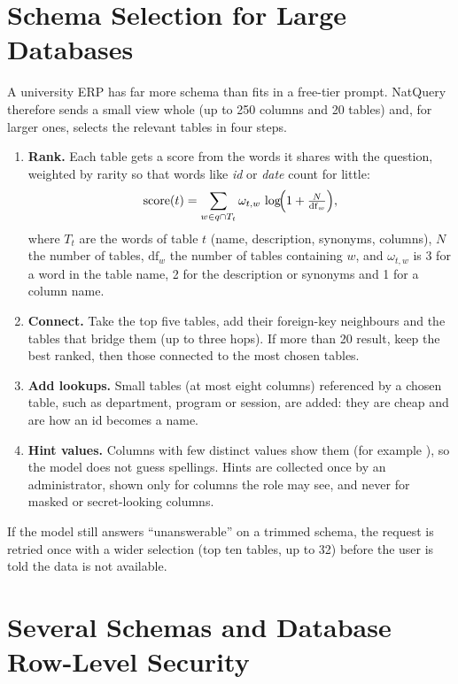 \section{Schema Selection for Large Databases}
\label{sec:select}

A university ERP has far more schema than fits in a free-tier prompt. NatQuery therefore sends a small
view whole (up to 250 columns and 20 tables) and, for larger ones, selects the relevant tables in four
steps.

\begin{enumerate}
  \item \textbf{Rank.} Each table gets a score from the words it shares with the question,
        weighted by rarity so that words like \emph{id} or \emph{date} count for little:
        \[
          \mathrm{score}(t) = \sum_{w \in q \cap T_t} \omega_{t,w}\,\log\!\Bigl(1 + \tfrac{N}{\mathrm{df}_w}\Bigr),
        \]
        where $T_t$ are the words of table $t$ (name, description, synonyms, columns), $N$ the number
        of tables, $\mathrm{df}_w$ the number of tables containing $w$, and $\omega_{t,w}$ is 3 for a
        word in the table name, 2 for the description or synonyms and 1 for a column name.
  \item \textbf{Connect.} Take the top five tables, add their foreign-key neighbours and the tables
        that bridge them (up to three hops). If more than 20 result, keep the best ranked, then those
        connected to the most chosen tables.
  \item \textbf{Add lookups.} Small tables (at most eight columns) referenced by a chosen table, such as
        department, program or session, are added: they are cheap and are how an id becomes a name.
  \item \textbf{Hint values.} Columns with few distinct values show them (for example
        ), so the model does not guess spellings. Hints are
        collected once by an administrator, shown only for columns the role may see, and never for
        masked or secret-looking columns.
\end{enumerate}

If the model still answers ``unanswerable'' on a trimmed schema, the request is retried once with a wider
selection (top ten tables, up to 32) before the user is told the data is not available.

\section{Several Schemas and Database Row-Level Security}
\label{sec:rls}

